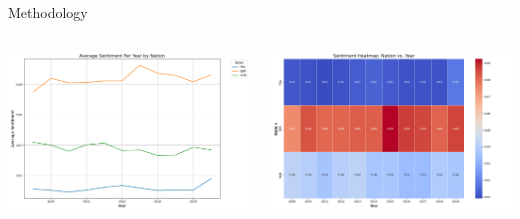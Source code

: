 \documentclass[8pt]{beamer}
\begin{document}
\begin{frame}{Methodology}
    \begin{columns}[T]
        \begin{column}{0.5\textwidth}
            \includegraphics[width=\textwidth]{img/average_sentiment_per_year.png}
        \end{column}
        \begin{column}{0.5\textwidth}
            \includegraphics[width=\textwidth]{img/sentiment_heatmap.png}
        \end{column}
    \end{columns}
\end{frame}
\end{document}
